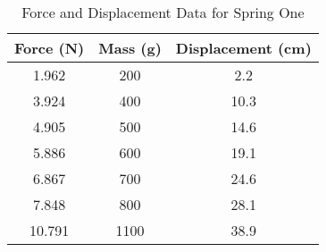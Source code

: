 
\begin{table}[H]
	\centering
	\caption{Force and Displacement Data for Spring One\label{table1}}
	\begin{tabular}{ccc}
		\hline
		\textbf{Force (N)} & \textbf{Mass (g)} & \textbf{Displacement (cm)} \\
		\hline
		1.962              & 200               & 2.2                        \\
		3.924              & 400               & 10.3                       \\
		4.905              & 500               & 14.6                       \\
		5.886              & 600               & 19.1                       \\
		6.867              & 700               & 24.6                       \\
		7.848              & 800               & 28.1                       \\
		10.791             & 1100              & 38.9                       \\
		\hline
	\end{tabular}
\end{table}
